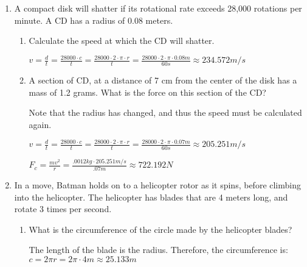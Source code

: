 \documentclass[letterpaper, 12pt]{article}
\begin{document}
\begin{enumerate}
	\item A compact disk will shatter if its rotational rate exceeds 28,000 rotations per minute.  A CD has a radius of 0.08 meters.
		\begin{enumerate}
			\item Calculate the speed at which the CD will shatter.
				
			\color{red}
			\begin{center}
				\vspace{.25in} 	
				$ v = \frac{d}{t} = \frac{28000 \cdot c} {t} = \frac{28000 \cdot 2 \cdot \pi \cdot r}{t} = \frac{28000 \cdot 2 \cdot \pi \cdot 0.08m}{60s} \approx 234.572 m/s  	$
			\end{center}
			\color{black}
			\vspace{.25in} 	
				
				
			\item A section of CD, at a distance of 7 cm from the center of the disk has a mass of 1.2 grams. What is the force on this section of the CD?
		\begin{center}
		\vspace{.15in}
		\color{red}
		Note that the radius has changed, and thus the speed must be calculated again. 
		\vspace{0.15in}
		
		$ v = \frac{d}{t} = \frac{28000 \cdot c} {t} = \frac{28000 \cdot 2 \cdot \pi \cdot r}{t} = \frac{28000 \cdot 2 \cdot \pi \cdot 0.07m}{60s} \approx 205.251 m/s  	$
		
		$F_c = \frac{m v^2}{r} = \frac{.0012 kg \cdot 205.251 m/s} {.07 m} \approx 722.192 N$
			\end{center}
	\color{black}
	\vspace{.35in} 	
				
				
				
				
				
		\end{enumerate}
	
	\item In a move, Batman holds on to a helicopter rotor as it spins, before climbing into the helicopter. The helicopter has blades that are 4 meters long, and rotate 3 times per second.  
	\begin{enumerate}
		\item What is the circumference of the circle made by the helicopter blades?   
			\vspace{.15in}
	\color{red}
	\begin{center}
		The length of the blade is the radius.  Therefore, the circumference is:
		$c = 2 \pi r = 2 \pi \cdot 4 m \approx 25.133 m$
\end{center}
\color{black}
\vspace{.25in} 	
									

\end{enumerate}
\end{enumerate}
\end{document}
